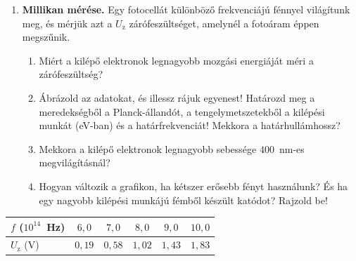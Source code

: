\documentclass[12pt]{article}
\begin{document}
\vspace{2pt}
\begin{minipage}[t]{0.58\linewidth}\vspace{0pt}
\begin{enumerate}[start=4]
\item \textbf{Millikan mérése.} Egy fotocellát különböző frekvenciájú fénnyel
  világítunk meg, és mérjük azt a $U_\text{z}$ zárófeszültséget, amelynél a fotoáram
  éppen megszűnik.
  \begin{enumerate}
    \item Miért a kilépő elektronok legnagyobb mozgási energiáját méri a zárófeszültség?
    \item Ábrázold az adatokat, és illessz rájuk egyenest! Határozd meg a meredekségből
      a Planck-állandót, a tengelymetszetekből a kilépési munkát (eV-ban) és a
      határfrekvenciát! Mekkora a határhullámhossz?
    \item Mekkora a kilépő elektronok legnagyobb sebessége $400$~nm-es megvilágításnál?
    \item Hogyan változik a grafikon, ha kétszer erősebb fényt használunk? És ha egy
      nagyobb kilépési munkájú fémből készült katódot? Rajzold be!
  \end{enumerate}
\end{enumerate}
\end{minipage}\hfill
\begin{minipage}[t]{0.40\linewidth}\vspace{0pt}\centering
\renewcommand{\arraystretch}{1.2}
  \begin{tabular}{|l|c|c|c|c|c|}
  \hline
  $f$ ($10^{14}$~Hz) & $6{,}0$ & $7{,}0$ & $8{,}0$ & $9{,}0$ & $10{,}0$ \\ \hline
  $U_\text{z}$ (V)   & $0{,}19$ & $0{,}58$ & $1{,}02$ & $1{,}43$ & $1{,}83$ \\ \hline
  \end{tabular}
\\[6pt]
\end{minipage}
\end{document}
